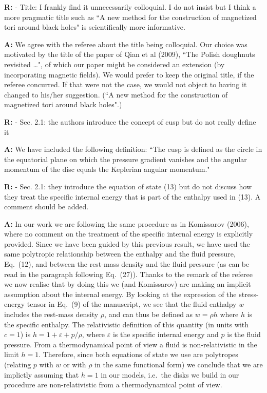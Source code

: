 \documentclass{article}
\begin{document}
\bigskip

{\bf R:} - Title: I frankly find it unnecessarily colloquial. I do not insist but
I think a more pragmatic title such as ``A new method for the
construction of magnetized tori around black holes" is scientifically
more informative.

\bigskip

{\bf A:} We agree with the referee about the title being colloquial. Our choice was
motivated by the title of the paper of Qian et al (2009), ``The Polish 
doughnuts revisited …", of which our paper might be considered an extension 
(by incorporating magnetic fields). We would prefer to keep the original 
title, if the referee concurred. If that were not the case, we would not
object to having it changed to his/her suggestion. (``A new method for the
construction of magnetized tori around black holes".)

\bigskip

{\bf R:} - Sec. 2.1: the authors introduce the concept of cusp but do not really
define it

\bigskip

{\bf A:} We have included the following definition: ``The cusp is defined as the circle 
in the equatorial plane on which the pressure gradient vanishes and the angular 
momentum of the disc equals the Keplerian angular momentum." 

\bigskip

{\bf R:} - Sec. 2.1: they introduce the equation of state (13) but do not discuss
how they treat the specific internal energy that is part of the
enthalpy used in (13). A comment should be added.

\bigskip

{\bf A:} In our work we are following the same procedure as in Komissarov (2006), where no comment on the treatment
of the specific internal energy is explicitly provided. Since we have been guided by this previous result, we have used the
same polytropic relationship between the enthalpy and the fluid pressure, Eq.~(12), and between the rest-mass density and the
fluid pressure (as can be read in the paragraph following Eq.~(27)). Thanks to the remark of the referee we now realise 
that by doing this we (and Komissarov) are making an implicit assumption about the internal energy. By looking at the 
expression of the stress-energy tensor in Eq.~(9) of the manuscript, we see that the fluid enthalpy $w$ includes the 
rest-mass density $\rho$, and can thus be defined as $w=\rho h$ where $h$ is the specific enthalpy. The relativistic definition 
of this quantity (in units with $c=1$) is $h=1+\varepsilon+p/\rho$, where $\varepsilon$ is the specific internal energy and 
$p$ is the fluid pressure. From a thermodynamical point of view a fluid is non-relativistic in the limit $h=1$. Therefore,
since both equations of state we use are polytropes (relating $p$ with $w$ or with $\rho$ in the same functional form) we 
conclude that we are implictly assuming that $h=1$ in our models, i.e.~the disks we build in our procedure are non-relativistic 
from a thermodynamical point of view.
\end{document}
